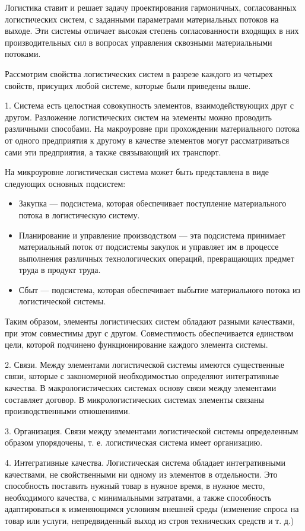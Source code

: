 Логистика ставит и решает задачу проектирования гармоничных, согласованных логистических систем, с заданными параметрами материальных потоков на выходе.
Эти системы отличает высокая степень согласованности входящих в них производительных сил в вопросах управления сквозными материальными потоками.

Рассмотрим свойства логистических систем в разрезе каждого из четырех свойств, присущих любой системе, которые были приведены выше.

1. Система есть целостная совокупность элементов, взаимодействующих друг с другом.
Разложение логистических систем на элементы можно проводить различными способами.
На макроуровне при прохождении материального потока от одного предприятия к другому в качестве элементов могут рассматриваться сами эти предприятия, а также связывающий их транспорт.

На микроуровне логистическая система может быть представлена в виде следующих основных подсистем:
\begin{itemize}
	\item Закупка --- подсистема, которая обеспечивает поступление материального потока в логистическую систему.
	\item Планирование и управление производством --- эта подсистема принимает материальный поток  от подсистемы закупок и управляет им в процессе выполнения различных технологических операций, превращающих предмет труда в продукт труда.
	\item Сбыт --- подсистема, которая обеспечивает выбытие материального потока из логистической системы.
\end{itemize}

Таким образом, элементы логистических систем обладают разными качествами, при этом совместимы друг с другом.
Совместимость обеспечивается единством цели, которой подчинено функционирование каждого элемента системы.

2. Связи.
Между элементами логистической системы имеются существенные связи, которые с закономерной необходимостью определяют интегративные качества.
В макрологистических системах основу связи между элементами составляет договор.
В микрологистических системах элементы связаны производственными отношениями.

3. Организация.
Связи между элементами логистической системы определенным образом упорядочены, т. е. логистическая система имеет организацию.

4. Интегративные качества.
Логистическая система обладает интегративными качествами, не свойственными ни одному из элементов в отдельности.
Это способность поставить нужный товар в нужное время, в нужное место, необходимого качества, с минимальными затратами, а также способность адаптироваться к изменяющимся условиям внешней среды (изменение спроса на товар или услуги, непредвиденный выход из строя технических средств и т. д.)



